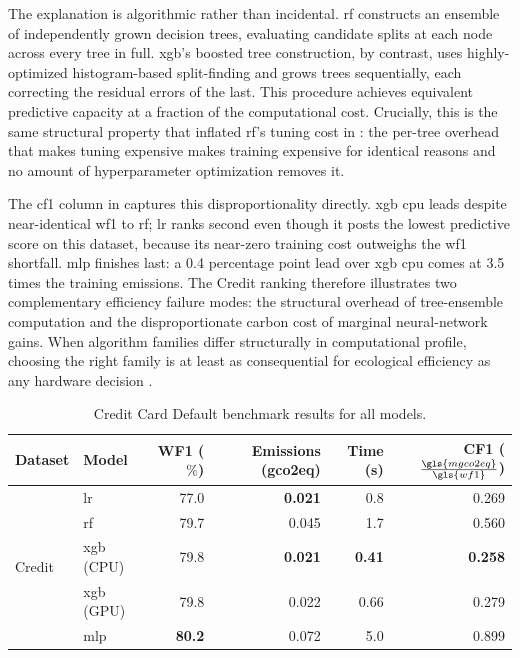 The explanation is algorithmic rather than incidental. \gls{rf} constructs an ensemble of independently grown decision trees, evaluating candidate splits at each node across every tree in full. \gls{xgb}'s boosted tree construction, by contrast, uses highly-optimized histogram-based split-finding and grows trees sequentially, each correcting the residual errors of the last. This procedure achieves equivalent predictive capacity at a fraction of the computational cost. Crucially, this is the same structural property that inflated \gls{rf}'s tuning cost in : the per-tree overhead that makes tuning expensive makes training expensive for identical reasons and no amount of hyperparameter optimization removes it.

The \gls{cf1} column in  captures this disproportionality directly. \gls{xgb} \gls{cpu} leads despite near-identical \gls{wf1} to \gls{rf}; \gls{lr} ranks second even though it posts the lowest predictive score on this dataset, because its near-zero training cost outweighs the \gls{wf1} shortfall. \gls{mlp} finishes last: a 0.4 percentage point lead over \gls{xgb} \gls{cpu} comes at 3.5 times the training emissions. The Credit ranking therefore illustrates two complementary efficiency failure modes: the structural overhead of tree-ensemble computation and the disproportionate carbon cost of marginal neural-network gains. When algorithm families differ structurally in computational profile, choosing the right family is at least as consequential for ecological efficiency as any hardware decision \parencite{verdecchiaDataCentricGreenAI2022a}.

\begin{table}[htbp]
\centering
\caption{Credit Card Default benchmark results for all models.}
\label{tab:credit_results}
\small
\begin{tabular}{@{} l l r r r r @{}}
\toprule
Dataset & Model & WF1 ($\%$) & Emissions (\gls{gco2eq}) & Time (s) & CF1 ($\frac{\gls{mgco2eq}}{\gls{wf1}}$) \\
\midrule
\multirow{5}{*}{Credit}
  & \gls{lr}          & 77.0          & \textbf{0.021} &          0.8  & 0.269 \\
  & \gls{rf}          & 79.7          &          0.045 &          1.7  & 0.560 \\
  & \gls{xgb} (CPU)   & 79.8          & \textbf{0.021} & \textbf{0.41} & \textbf{0.258} \\
  & \gls{xgb} (GPU)   & 79.8          &          0.022 &          0.66 & 0.279 \\
  & \gls{mlp}         & \textbf{80.2} &          0.072 &          5.0  & 0.899 \\
\bottomrule
\end{tabular}
\end{table}


